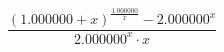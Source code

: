 \documentclass{article}
\title{}
\author{}
\begin{document}
\maketitle
$$\frac{\left(1.000000+x\right)^{\frac{1.000000}{x}}-2.000000^{x}}{2.000000^{x} \cdot x}$$
\end{document}
